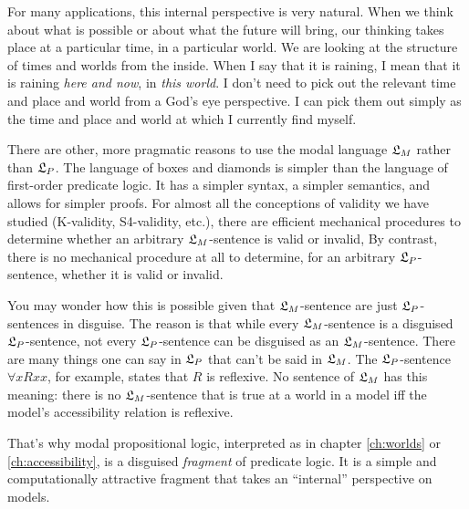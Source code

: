 For many applications, this internal perspective is very natural. When we think
about what is possible or about what the future will bring, our thinking takes
place at a particular time, in a particular world. We are looking at the
structure of times and worlds from the inside. When I say that it is raining, I
mean that it is raining \emph{here and now}, in \emph{this world}. I don't need
to pick out the relevant time and place and world from a God's eye perspective.
I can pick them out simply as the time and place and world at which I currently
find myself.

There are other, more pragmatic reasons to use the modal language $\mathfrak{L}_M$ rather
than $\mathfrak{L}_P$. The language of boxes and diamonds is simpler than the language of
first-order predicate logic. It has a simpler syntax, a simpler semantics, and
allows for simpler proofs. For almost all the conceptions of validity we have
studied (K-validity, S4-validity, etc.), there are efficient mechanical
procedures to determine whether an arbitrary $\mathfrak{L}_M$-sentence is valid or
invalid, By contrast, there is no mechanical procedure at all to determine, for
an arbitrary $\mathfrak{L}_P$-sentence, whether it is valid or invalid.

You may wonder how this is possible given that $\mathfrak{L}_M$-sentence are just
$\mathfrak{L}_P$-sentences in disguise. The reason is that while every $\mathfrak{L}_M$-sentence is
a disguised $\mathfrak{L}_P$-sentence, not every $\mathfrak{L}_P$-sentence can be disguised as an
$\mathfrak{L}_M$-sentence. There are many things one can say in $\mathfrak{L}_P$ that can't be said
in $\mathfrak{L}_M$. The $\mathfrak{L}_{P}$-sentence $\forall x Rxx$, for example, states that $R$
is reflexive. No sentence of $\mathfrak{L}_M$ has this meaning: there is no
$\mathfrak{L}_{M}$-sentence that is true at a world in a model iff the model's
accessibility relation is reflexive.

That's why modal propositional logic, interpreted as in chapter \ref{ch:worlds}
or \ref{ch:accessibility}, is a disguised \emph{fragment} of predicate logic. It
is a simple and computationally attractive fragment that takes an ``internal''
perspective on models.

